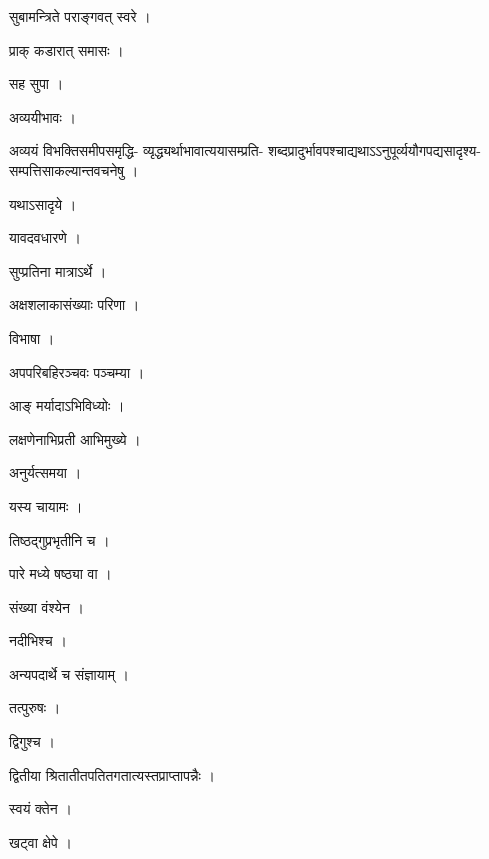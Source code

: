 \documentclass[10pt, openany]{book}
\begin{document}
\noindent सुबामन्त्रिते पराङ्गवत् स्वरे ।

\noindent प्राक् कडारात् समासः ।

\noindent सह सुपा ।

\noindent अव्ययीभावः ।

\noindent अव्ययं विभक्तिसमीपसमृद्धि- व्यृद्ध्यर्थाभावात्ययासम्प्रति- शब्दप्रादुर्भावपश्चाद्यथाऽऽनुपूर्व्ययौगपद्यसादृश्य- सम्पत्तिसाकल्यान्तवचनेषु ।

\noindent यथाऽसादृये ।

\noindent यावदवधारणे ।

\noindent सुप्प्रतिना मात्राऽर्थे ।

\noindent अक्षशलाकासंख्याः परिणा ।

\noindent विभाषा ।

\noindent अपपरिबहिरञ्चवः पञ्चम्या ।

\noindent आङ् मर्यादाऽभिविध्योः ।

\noindent लक्षणेनाभिप्रती आभिमुख्ये ।

\noindent अनुर्यत्समया ।

\noindent यस्य चायामः ।

\noindent तिष्ठद्गुप्रभृतीनि च ।

\noindent पारे मध्ये षष्ठ्या वा ।

\noindent संख्या वंश्येन ।

\noindent नदीभिश्च ।

\noindent अन्यपदार्थे च संज्ञायाम् ।

\noindent तत्पुरुषः ।

\noindent द्विगुश्च ।

\noindent द्वितीया श्रितातीतपतितगतात्यस्तप्राप्तापन्नैः ।

\noindent स्वयं क्तेन ।

\noindent खट्वा क्षेपे ।
\end{document}
